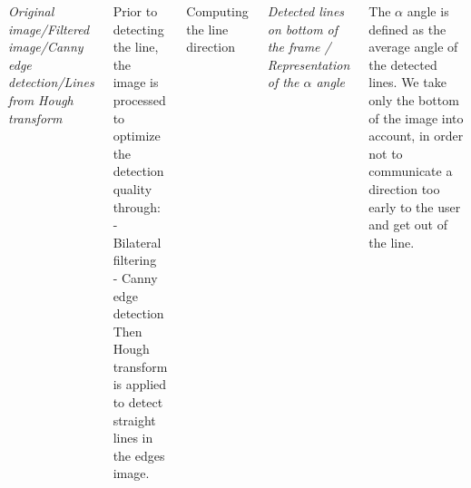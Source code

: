 \documentclass[17pt, a1paper, portrait]{tikzposter}
\begin{document}
\begin{columns}
{\begin{center}
\caption{\emph{Original image/Filtered image/Canny edge detection/Lines from Hough transform}}
\end{center}

Prior to detecting the line, the image is processed to optimize the detection quality through: \\
- Bilateral filtering \\
- Canny edge detection \\
Then Hough transform is applied to detect straight lines in the edges image.
 

\vspace{2mm}

\begin{center} \LARGE {Computing the line direction}
\end{center}

\begin{center}
\centering
\caption{\emph{Detected lines on bottom of the frame / Representation of the \(\alpha\) angle}}
\end{center}
The \(\alpha\) angle is defined as the average angle of the detected lines. We take only the bottom of the image into account, in order not to communicate a direction too early to the user and get
out of the line.

}
\end{columns}
\end{document}
